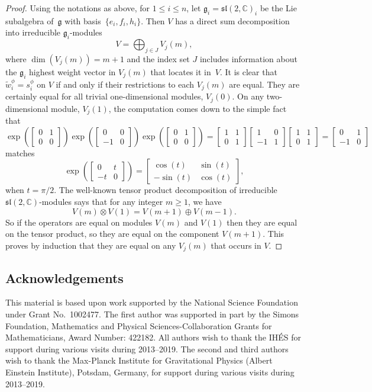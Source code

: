 \documentclass[pdftex]{sigma}
\numberwithin{equation}{section}
\def\C{{\mathbb C}}
\def\tw{{\widetilde{w}}}
\def\bm{\begin{bmatrix}}
\def\ebm{\end{bmatrix}}
\def\fg{\mathfrak{g}}
\def\fsl{\mathfrak{sl}}
\begin{document}
\begin{proof}Using the notations as above, for $1\leq i\leq n$, let $\fg_i = \fsl(2,\C)_i$ be the Lie subalgebra of~$\fg$ with basis~$\{e_i,f_i,h_i\}$. Then $V$ has a direct sum decomposition into irreducible $\fg_i$-modules
\[V = \bigoplus_{j\in J} V_j(m),\]
where $\dim(V_j(m)) = m+1$ and the index set $J$ includes information about the $\fg_i$ highest weight vector in $V_j(m)$ that locates it in~$V$.
It is clear that $\tw_i^\phi = s_i^\phi$ on $V$ if and only if their restrictions to each $V_j(m)$ are equal. They are certainly equal for all trivial one-dimensional modules, $V_j(0)$. On any two-dimensional module, $V_j(1)$, the computation comes down to the simple fact that
\[\exp\left( \bm 0&1\\0&0\ebm \right) \exp\left( \bm 0&0\\-1&0\ebm \right) \exp\left( \bm 0&1\\0&0\ebm \right)
= \bm 1&1\\0&1\ebm \bm 1&0\\-1&1\ebm \bm 1&1\\0&1\ebm = \bm 0&1\\-1&0\ebm \]
matches
\[\exp\left( \bm 0&t\\-t&0\ebm \right) = \bm \cos(t)&\sin(t) \\-\sin(t)&\cos(t) \ebm,\]
when $t = \pi/2$. The well-known tensor product decomposition of irreducible $\fsl(2,\C)$-modules says that for any integer $m\geq 1$, we have
\[V(m)\otimes V(1) = V(m+1) \oplus V(m-1).\]
So if the operators are equal on modules $V(m)$ and $V(1)$ then they are equal on the tensor product, so they are equal on the component
$V(m+1)$. This proves by induction that they are equal on any $V_j(m)$ that occurs in $V$.
\end{proof}

\subsection*{Acknowledgements}
This material is based upon work supported by the National Science Foundation under Grant No.~1002477. The first author was supported in part by the Simons Foundation, Mathematics and Physical Sciences-Collaboration Grants for Mathematicians, Award Number: 422182. All authors wish to thank the IH\'ES for support during various visits during 2013--2019. The second and third authors wish to thank the Max-Planck Institute for Gravitational Physics (Albert Einstein Institute), Potsdam, Germany, for support during various visits during 2013--2019.
\end{document}
